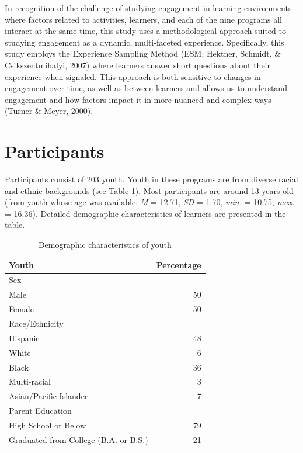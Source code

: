 \documentclass[]{msu-thesis}
\theoremstyle{definition}
\theoremstyle{definition}
\theoremstyle{definition}
\theoremstyle{remark}
\begin{document}
In recognition of the challenge of studying engagement in learning
environments where factors related to activities, learners, and each of
the nine programs all interact at the same time, this study uses a
methodological approach suited to studying engagement as a dynamic,
multi-faceted experience. Specifically, this study employs the
Experience Sampling Method (ESM; Hektner, Schmidt, \& Csikszentmihalyi,
2007) where learners answer short questions about their experience when
signaled. This approach is both sensitive to changes in engagement over
time, as well as between learners and allows us to understand engagement
and how factors impact it in more nuanced and complex ways (Turner \&
Meyer, 2000).

\section{Participants}\label{participants}

Participants consist of 203 youth. Youth in these programs are from
diverse racial and ethnic backgrounds (see Table 1). Most participants
are around 13 years old (from youth whose age was available: \emph{M} =
12.71, \emph{SD} = 1.70, \emph{min.} = 10.75, \emph{max.} = 16.36).
Detailed demographic characteristics of learners are presented in the
table.

\begin{table}

\caption{\label{tab:unnamed-chunk-3}Demographic characteristics of youth}
\centering
\begin{tabular}[t]{lr}
\toprule
Youth & Percentage\\
\midrule
Sex & \\
Male & 50\\
Female & 50\\
Race/Ethnicity & \\
Hispanic & 48\\
\addlinespace
White & 6\\
Black & 36\\
Multi-racial & 3\\
Asian/Pacific Islander & 7\\
Parent Education & \\
\addlinespace
High School or Below & 79\\
Graduated from College (B.A. or B.S.) & 21\\
\bottomrule
\end{tabular}
\end{table}
\end{document}
